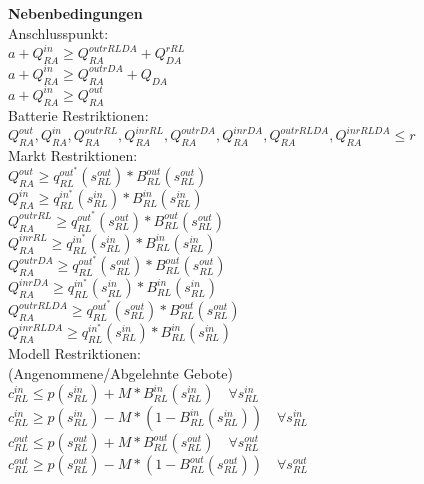 \textbf{Nebenbedingungen}\\
Anschlusspunkt:\\
$a + Q^{in}_{RA} \geq Q^{outrRLDA}_{RA} + Q^{rRL}_{DA}$ \\
$a + Q^{in}_{RA} \geq Q^{outrDA}_{RA} + Q_{DA}$ \\
$a + Q^{in}_{RA} \geq Q^{out}_{RA}$ \\
Batterie Restriktionen:\\
$Q^{out}_{RA}, Q^{in}_{RA}, Q^{outrRL}_{RA}, Q^{inrRL}_{RA}, Q^{outrDA}_{RA}, Q^{inrDA}_{RA}, Q^{outrRLDA}_{RA}, Q^{inrRLDA}_{RA} \leq r$\\
Markt Restriktionen:\\
$Q^{out}_{RA} \geq q^{out^*}_{RL} (s^{out}_{RL}) * B^{out}_{RL} (s^{out}_{RL}) $\\
$Q^{in}_{RA} \geq q^{in^*}_{RL} (s^{in}_{RL}) * B^{in}_{RL} (s^{in}_{RL}) $\\
$Q^{outrRL}_{RA} \geq q^{out^*}_{RL} (s^{out}_{RL}) * B^{out}_{RL} (s^{out}_{RL}) $\\
$Q^{inrRL}_{RA} \geq q^{in^*}_{RL} (s^{in}_{RL}) * B^{in}_{RL} (s^{in}_{RL}) $\\
$Q^{outrDA}_{RA} \geq q^{out^*}_{RL} (s^{out}_{RL}) * B^{out}_{RL} (s^{out}_{RL}) $\\
$Q^{inrDA}_{RA} \geq q^{in^*}_{RL} (s^{in}_{RL}) * B^{in}_{RL} (s^{in}_{RL}) $\\
$Q^{outrRLDA}_{RA} \geq q^{out^*}_{RL} (s^{out}_{RL}) * B^{out}_{RL} (s^{out}_{RL}) $\\
$Q^{inrRLDA}_{RA} \geq q^{in^*}_{RL} (s^{in}_{RL}) * B^{in}_{RL} (s^{in}_{RL}) $\\
Modell Restriktionen:\\
(Angenommene/Abgelehnte Gebote)\\
$c^{in}_{RL} \leq p(s^{in}_{RL}) + M * B^{in}_{RL}(s^{in}_{RL})\quad\forall s^{in}_{RL} $ \\
$c^{in}_{RL} \geq p(s^{in}_{RL}) - M * (1 - B^{in}_{RL}(s^{in}_{RL}))\quad\forall s^{in}_{RL} $ \\
$c^{out}_{RL} \leq p(s^{out}_{RL}) + M * B^{out}_{RL}(s^{out}_{RL})\quad\forall s^{out}_{RL} $ \\
$c^{out}_{RL} \geq p(s^{out}_{RL}) - M * (1 - B^{out}_{RL}(s^{out}_{RL}))\quad\forall s^{out}_{RL} $ \\




